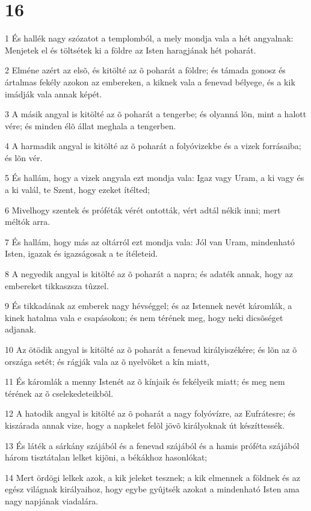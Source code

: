 \chapter{16}

\par 1 És hallék nagy szózatot a templomból, a mely mondja vala a hét angyalnak: Menjetek el és töltsétek ki a földre az Isten haragjának hét poharát.
\par 2 Elméne azért az elsõ, és kitölté az õ poharát a földre; és támada gonosz és ártalmas fekély azokon az embereken, a kiknek vala a fenevad bélyege, és a kik imádják vala annak képét.
\par 3 A másik angyal is kitölté az õ poharát a tengerbe; és olyanná lõn, mint a halott vére; és minden élõ állat meghala a tengerben.
\par 4 A harmadik angyal is kitölté az õ poharát a folyóvizekbe és a vizek forrásaiba; és lõn vér.
\par 5 És hallám, hogy a vizek angyala ezt mondja vala: Igaz vagy Uram, a ki vagy és a ki valál, te Szent, hogy ezeket ítélted;
\par 6 Mivelhogy szentek és próféták vérét ontották, vért adtál nékik inni; mert méltók arra.
\par 7 És hallám, hogy más az oltárról ezt mondja vala: Jól van Uram, mindenható Isten, igazak és igazságosak a  te ítéleteid.
\par 8 A negyedik angyal is kitölté az õ poharát a napra; és adaték annak, hogy az embereket tikkaszsza tûzzel.
\par 9 És tikkadának az emberek nagy hévséggel; és az Istennek nevét káromlák, a kinek hatalma vala e csapásokon; és nem térének  meg, hogy neki dicsõséget adjanak.
\par 10 Az ötödik angyal is kitölté az õ poharát a fenevad királyiszékére; és lõn az õ országa setét; és rágják vala az õ nyelvöket a kín miatt,
\par 11 És káromlák a menny Istenét az õ kínjaik és fekélyeik miatt; és meg nem térének  az õ cselekedeteikbõl.
\par 12 A hatodik angyal is kitölté az õ poharát a nagy folyóvízre, az Eufrátesre; és kiszárada annak vize, hogy a napkelet felõl jövõ királyoknak út készíttessék.
\par 13 És láték a sárkány szájából és a fenevad  szájából és a hamis próféta szájából három tisztátalan lelket kijõni, a békákhoz hasonlókat;
\par 14 Mert ördögi lelkek azok, a kik jeleket tesznek; a kik elmennek a földnek és az egész világnak királyaihoz, hogy egybe gyûjtsék  azokat a mindenható Isten ama nagy napjának viadalára.
